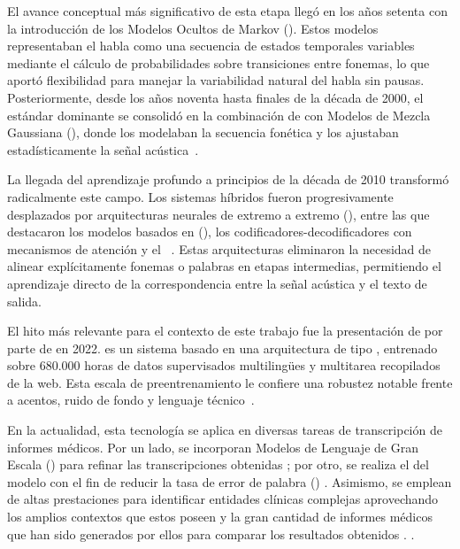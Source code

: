 El avance conceptual más significativo de esta etapa llegó en los años setenta con la introducción de los Modelos Ocultos
de Markov ().
Estos modelos representaban el habla como una secuencia de estados temporales variables mediante el cálculo de probabilidades
sobre transiciones entre fonemas, lo que aportó flexibilidad para manejar la variabilidad natural del habla sin pausas. 
Posteriormente, desde los años noventa hasta finales de la década de 2000, el estándar dominante se consolidó en la
combinación de  con Modelos de Mezcla Gaussiana (), donde los  modelaban
la secuencia fonética y los  ajustaban estadísticamente la señal acústica~.

La llegada del aprendizaje profundo a principios de la década de 2010 transformó radicalmente este campo. 
Los sistemas híbridos  fueron progresivamente desplazados por arquitecturas neurales de extremo
a extremo (), entre las que destacaron los modelos basados en  (), los codificadores-decodificadores con mecanismos de atención y el ~. 
Estas arquitecturas eliminaron la necesidad de alinear explícitamente fonemas o palabras en etapas intermedias, 
permitiendo el aprendizaje directo de la correspondencia entre la señal acústica y el texto de salida.

El hito más relevante para el contexto de este trabajo fue la presentación de  por parte de
 en 2022. 
 es un sistema  basado en una arquitectura  de tipo
, entrenado sobre 680.000 horas de datos supervisados multilingües y multitarea recopilados
de la web.
Esta escala de preentrenamiento le confiere una robustez notable frente a acentos, ruido de fondo y lenguaje
técnico~. 

En la actualidad, esta tecnología se aplica en diversas tareas de transcripción de informes médicos. Por un lado, se
incorporan Modelos de Lenguaje de Gran Escala () para refinar las
transcripciones obtenidas ;
por otro, se realiza el  del modelo  con el fin de reducir la tasa
de error de palabra () . Asimismo, se emplean  de altas
prestaciones para identificar entidades clínicas complejas aprovechando los amplios contextos que estos poseen y la gran
cantidad de informes médicos que han sido generados por ellos para comparar los resultados obtenidos
.
.

